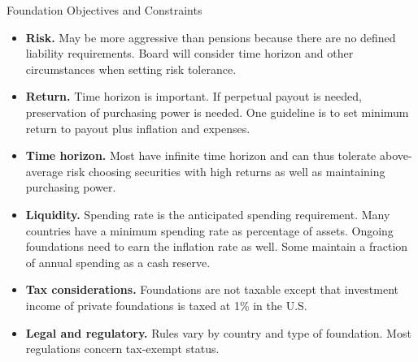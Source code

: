 \documentclass[../custom]{flashcards}
\begin{document}
\begin{flashcard}[\studyArea]{Foundation Objectives and Constraints}
    \begin{itemize}
        \item \textbf{Risk.} May be more aggressive than pensions because there are no defined liability requirements. Board will consider time horizon and other circumstances when setting risk tolerance.
        \item \textbf{Return.} Time horizon is important. If perpetual payout is needed, preservation of purchasing power is needed. One guideline is to set minimum return to payout plus inflation and expenses.
        \item \textbf{Time horizon.} Most have infinite time horizon and can thus tolerate above-average risk choosing securities with high returns as well as maintaining purchasing power.
        \item \textbf{Liquidity.} Spending rate is the anticipated spending requirement. Many countries have a minimum spending rate as percentage of assets. Ongoing foundations need to earn the inflation rate as well. Some maintain a fraction of annual spending as a cash reserve.
        \item \textbf{Tax considerations.} Foundations are not taxable except that investment income of private foundations is taxed at 1\% in the U.S\@.
        \item \textbf{Legal and regulatory.} Rules vary by country and type of foundation. Most regulations concern tax-exempt status.
    \end{itemize}
\end{flashcard}
\end{document}
